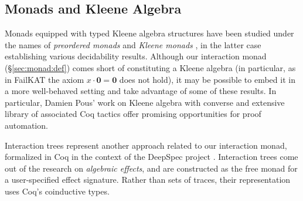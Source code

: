 \documentclass[sigplan,10pt,review,anonymous]{acmart}
\begin{document}

\subsection{Monads and Kleene Algebra} %

Monads equipped with
typed Kleene algebra structures
have been studied under the names of
\emph{preordered monads} \cite{pom} and
\emph{Kleene monads} \cite{kleenem},
in the latter case establishing various decidability results.
Although our interaction monad (\S\ref{sec:monad:def})
comes short of constituting a Kleene algebra
(in particular, as in FailKAT \cite{failkat}
the axiom $x \cdot \mathbf{0} = \mathbf{0}$ does not hold),
it may be possible to embed it in a more well-behaved setting
and take advantage of some of these results.
In particular,
Damien Pous' work on Kleene algebra with converse
and extensive library of associated Coq tactics
offer promising opportunities for proof automation.

Interaction trees \cite{itrees}
represent another approach
related to our interaction monad,
formalized in Coq in the context of the DeepSpec project \cite{deepspec}.
Interaction trees
come out of the research on \emph{algebraic effects},
and are constructed as the free monad
for a user-specified effect signature.
Rather than sets of traces,
their representation uses Coq's coinductive types.


%




\end{document}
